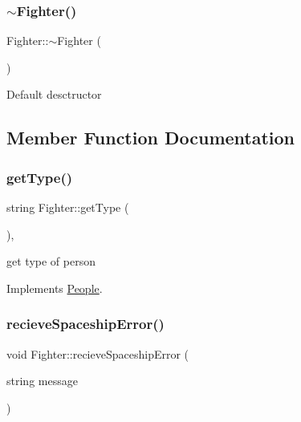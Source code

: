 \subsubsection{\texorpdfstring{$\sim$\+Fighter()}{~Fighter()}}
{\footnotesize\ttfamily Fighter\+::$\sim$\+Fighter (\begin{DoxyParamCaption}{ }\end{DoxyParamCaption})\hspace{0.3cm}{\ttfamily [inline]}}

Default desctructor 

\subsection{Member Function Documentation}
\mbox{\label{classFighter_ae8bd1a16211422b1898f41dec347281c}} 
\subsubsection{\texorpdfstring{get\+Type()}{getType()}}
{\footnotesize\ttfamily string Fighter\+::get\+Type (\begin{DoxyParamCaption}{ }\end{DoxyParamCaption})\hspace{0.3cm}{\ttfamily [inline]}, {\ttfamily [virtual]}}

get type of person 

Implements \hyperlink{classPeople_af60dd882d60cddf63f9b95815ce551a8}{People}.

\mbox{\label{classFighter_aecd2761c68aed8499e210fd0ca11c447}} 
\subsubsection{\texorpdfstring{recieve\+Spaceship\+Error()}{recieveSpaceshipError()}}
{\footnotesize\ttfamily void Fighter\+::recieve\+Spaceship\+Error (\begin{DoxyParamCaption}\item[{string}]{message }\end{DoxyParamCaption})\hspace{0.3cm}{\ttfamily [virtual]}}

